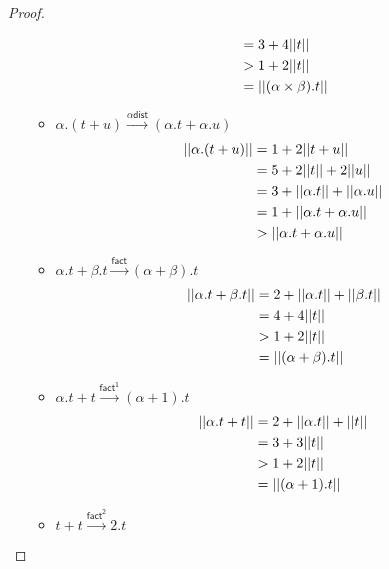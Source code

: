 \begin{proof}
\begin{itemize}
\begin{itemize}
\begin{equation*}
\begin{split}
            & = 3 + 4 ||t|| \\
            & > 1 + 2 ||t|| \\
            & = ||(\alpha \times \beta) . t||
          \end{split}
        \end{equation*}
        \item \( \alpha . (t + u) \xrightarrow{\alpha\mathsf{dist}} (\alpha . t + \alpha . u) \)
        \begin{equation*}
          \begin{split}
            ||\alpha . (t + u)||
            & = 1 + 2 ||t + u|| \\
            & = 5 + 2 ||t|| + 2 ||u|| \\
            & = 3 + ||\alpha . t|| + ||\alpha . u|| \\
            & = 1 + ||\alpha . t + \alpha . u|| \\
            & > ||\alpha . t + \alpha . u||
          \end{split}
        \end{equation*}
        \item \( \alpha . t + \beta . t \xrightarrow{\mathsf{fact}} (\alpha + \beta) . t \)
        \begin{equation*}
          \begin{split}
            ||\alpha . t + \beta . t||
            & = 2 + ||\alpha . t|| + ||\beta . t|| \\
            & = 4 + 4 ||t|| \\
            & > 1 + 2 ||t|| \\
            & = ||(\alpha + \beta) . t||
          \end{split}
        \end{equation*}
        \item \( \alpha . t + t \xrightarrow{\mathsf{fact^1}} (\alpha + 1) . t \)
        \begin{equation*}
          \begin{split}
            ||\alpha . t + t||
            & = 2 + ||\alpha . t|| + ||t|| \\
            & = 3 + 3 ||t|| \\
            & > 1 + 2 ||t|| \\
            & = ||(\alpha + 1) . t||
          \end{split}
        \end{equation*}
        \item \( t + t \xrightarrow{\mathsf{fact^2}} 2 . t \)

\end{itemize}
\end{itemize}
\end{proof}
